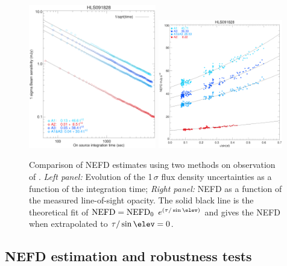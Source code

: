 \begin{figure}[!thbp]
  \begin{center}
    \includegraphics[trim={0.5cm, 0.5cm, 1.5cm, 1.8cm}, clip, angle=0, width=0.495\textwidth]{Figures/hls_nefd_vst.eps}
    \includegraphics[trim={0.5cm, 0, 0.2cm, 0.5cm}, clip, angle=0, width=0.485\textwidth]{Figures/hls_NEFD_vs_TauElev_all.eps}
    \caption{Comparison of NEFD estimates using two methods on
      observation of \hls. \emph{Left panel:} Evolution of the 1\,$\sigma$ flux density uncertainties as a function of the integration time; \emph{Right panel:} NEFD as a function of the measured line-of-sight opacity. The solid black line is the theoretical fit of $\rm{NEFD} = \rm{NEFD}_0$ $e^{(\tau/\sin\elev)}$ and gives the NEFD when extrapolated to $\tau/\sin\elev = 0$.}
    \label{fig:nefd_twomethods}
  \end{center}
\end{figure}

\subsection{NEFD estimation and robustness tests}
\label{se:nefd_results}

